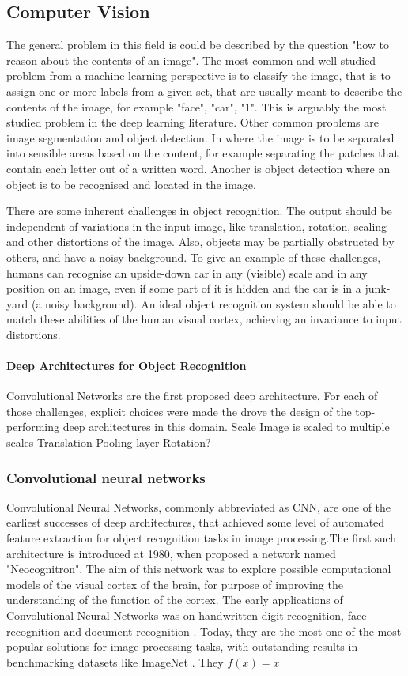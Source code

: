 \documentclass[a4paper]{report}
\begin{document}
	\subsection{Computer Vision}
		The general problem in this field is could be described by the question "how to reason about the contents of an image". 
		The most common and well studied problem from a machine learning perspective is to classify the image, that is to assign one or more labels from a given set, that are usually meant to describe the contents of the image, for example "face", "car", "1". This is arguably the most studied problem in the deep learning literature.
		Other common problems are image segmentation and object detection. In where the image is to be separated into sensible areas based on the content, for example separating the patches that contain each letter out of a written word. Another is object detection where an object is to be recognised and located in the image.
		
		There are some inherent challenges in object recognition. The output should be independent of variations in the input image, like translation, rotation, scaling and other distortions of the image. Also, objects may be partially obstructed by others, and have a noisy background. To give an example of these challenges, humans can recognise an upside-down car in any (visible) scale and in any position on an image, even if some part of it is hidden and the car is in a junk-yard (a noisy background). An ideal object recognition system should be able to match these abilities of the human visual cortex, achieving an invariance to input distortions. 
		
		\paragraph{Deep Architectures for Object Recognition}
		Convolutional Networks are the first proposed deep architecture,
		For each of those challenges, explicit choices were made the drove the design of the top-performing deep architectures in this domain.
		Scale
			Image is scaled to multiple scales
		Translation
			Pooling layer
		Rotation?
		\subsubsection{Convolutional neural networks}
		Convolutional Neural Networks, commonly abbreviated as CNN, are one of the earliest successes of deep architectures, that achieved some level of automated feature extraction \cite{LeCun1990} for object recognition tasks in image processing.The first such architecture is introduced at 1980, when \cite{Fukushima1980} proposed a network named "Neocognitron". The aim of this network was to explore possible computational models of the visual cortex of the brain, for purpose of improving the understanding of the function of the cortex.
		The early applications of Convolutional Neural Networks was on handwritten digit recognition\cite{LeCun1989,LeCun1990,Lecun1995}, face recognition \cite{Lawrence1997} and document recognition \cite{LeCun1998}. Today, they are the most one of the most popular solutions for image processing tasks, with outstanding results in benchmarking datasets like ImageNet \cite{Krizhevsky2012}. They
		$ f(x) = x  $
\end{document}
